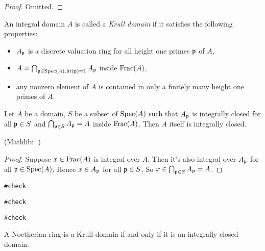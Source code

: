 \begin{proof}
\leanok
Omitted.
\end{proof}

\begin{definition}
\label{krull-domain-defn}
\leanok
An integral domain $A$ is called a \emph{Krull domain}
if it satisfies the following properties:
\begin{itemize}
\item
$A_{\mathfrak{p}}$ is a discrete valuation ring for all height one primes ${\mathfrak{p}}$ of $A$,
\item
$A=\bigcap_{{\mathfrak{p}}\in{\mathrm{Spec}}(A),{\mathrm{ht}}({\mathfrak{p}})=1}A_{\mathfrak{p}}$ inside ${\mathrm{Frac}}(A)$,
\item
any nonzero element of $A$ is contained in only a finitely many height one primes of $A$.
\end{itemize}
\end{definition}


\begin{lem}
\label{integrally-closed-is-local-prop}
\leanok
Let $A$ be a domain, $S$ be a subset of ${\mathrm{Spec}}(A)$
such that $A_{\mathfrak{p}}$ is integrally closed for all ${\mathfrak{p}}\in S$
and $\bigcap_{{\mathfrak{p}}\in S}A_{\mathfrak{p}}=A$ inside ${\mathrm{Frac}}(A)$.
Then $A$ itself is integrally closed.

(Mathlib: .)
\end{lem}

\begin{proof}
\leanok
Suppose $x\in{\mathrm{Frac}}(A)$ is integral over $A$. Then it's also integral over $A_{\mathfrak{p}}$
for all ${\mathfrak{p}}\in{\mathrm{Spec}}(A)$. Hence $x\in A_{\mathfrak{p}}$ for all ${\mathfrak{p}}\in S$.
So $x\in\bigcap_{{\mathfrak{p}}\in S}A_{\mathfrak{p}}=A$.
\end{proof}

\noindent\verb|#check |

\noindent\verb|#check |

\noindent\verb|#check |

\begin{prop}
\label{noeth-ring-is-krull-domain-iff}
\leanok
{}
A Noetherian ring is a Krull domain if and only if it is an integrally closed domain.
\end{prop}

